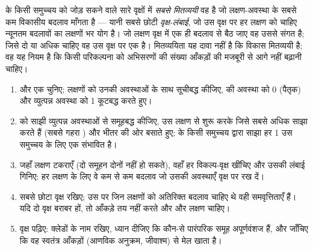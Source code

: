 \begin{definition}[मितव्ययिता]\label{def:b1:classifying-biodiversity:parsimony}
 के किसी समुच्चय को जोड़ सकने वाले सारे वृक्षों में
\emph{सबसे मितव्ययी} वह है जो लक्षण-अवस्था के सबसे कम विकासीय बदलाव
माँगता है --- यानी सबसे छोटी \emph{वृक्ष-लंबाई}, जो उस वृक्ष पर हर लक्षण
को चाहिए न्यूनतम बदलावों का लक्षणों भर योग है। जो लक्षण वृक्ष में एक ही
बदलाव से बैठ जाए वह उससे संगत है; जिसे दो या अधिक चाहिए वह उस वृक्ष पर एक
 है। मितव्ययिता यह दावा नहीं है कि विकास मितव्ययी है; वह यह
नियम है कि किसी परिकल्पना को अभिसरणों की संख्या आँकड़ों की मजबूरी से आगे
नहीं बढ़ानी चाहिए।
\end{definition}

\begin{method}[किसी लक्षण-आव्यूह से कोई क्लेडोग्राम बनाना]\label{met:b1:classifying-biodiversity:cladogram}
\begin{enumerate}
  \item {} और एक  चुनिए; लक्षणों को उनकी अवस्थाओं के साथ
        सूचीबद्ध कीजिए,  की अवस्था को 0 (पैतृक) और व्युत्पन्न
        अवस्था को 1 कूटबद्ध करते हुए।
  \item {} को साझी व्युत्पन्न अवस्थाओं से समूहबद्ध कीजिए, उस लक्षण
        से शुरू करके जिसे सबसे अधिक  साझा करते हैं (सबसे गहरा
        ) और भीतर की ओर बसाते हुए;  के किसी समुच्चय द्वारा
        साझा हर 1 उस समुच्चय के लिए एक संभावित  है।
  \item जहाँ लक्षण टकराएँ (दो समूहन दोनों  नहीं हो सकते), वहाँ हर
        विकल्प-वृक्ष खींचिए और उसकी लंबाई गिनिए: हर लक्षण के लिए वे कम
        से कम बदलाव जो उसकी अवस्थाएँ वृक्ष पर रख दें।
  \item सबसे छोटा वृक्ष रखिए; उस पर जिन लक्षणों को अतिरिक्त बदलाव चाहिए
        थे वही समवृत्तिताएँ हैं। यदि दो वृक्ष बराबर हों, तो आँकड़े तय
        नहीं करते और और लक्षण चाहिए।
  \item वृक्ष पढ़िए: क्लेडों के नाम रखिए, ध्यान दीजिए कि कौन-से पारंपरिक
        समूह अपूर्णवंशज हैं, और जाँचिए कि वह स्वतंत्र आँकड़ों (आणविक
        अनुक्रम, जीवाश्म) से मेल खाता है।
\end{enumerate}
\end{method}

